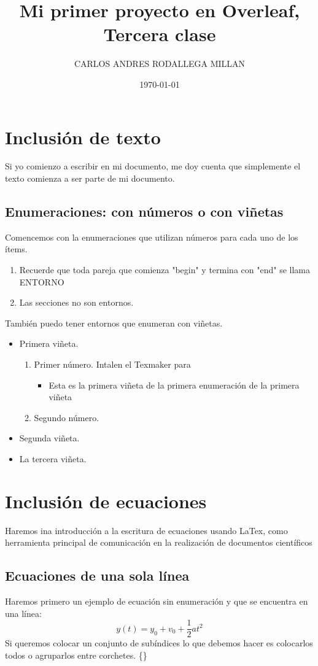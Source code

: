 \documentclass[onecolumn]{article} %
\title{Mi primer proyecto en Overleaf, Tercera clase}
\author{CARLOS ANDRES RODALLEGA MILLAN}
\date{\today}
\begin{document}
\maketitle %
\section{Inclusión de texto} %
Si yo comienzo a escribir en mi documento, me doy cuenta que simplemente el texto comienza a ser parte de mi documento.
\subsection{Enumeraciones: con números o con viñetas}
Comencemos con la enumeraciones que utilizan números para cada uno de los ítems.
\begin{enumerate}
    \item Recuerde que toda pareja que comienza "begin" y termina con "end" se llama ENTORNO
    \item Las secciones no son entornos.
\end{enumerate}
También puedo tener entornos que enumeran con viñetas.
\begin{itemize}
    \item Primera viñeta.
    \begin{enumerate}
        \item Primer número.
        Intalen el Texmaker para   
        \begin{itemize}
            \item Esta es la primera viñeta de la primera enumeración de la primera viñeta
        \end{itemize}
        \item Segundo número.
    \end{enumerate}
    \item Segunda viñeta.
    \item La tercera viñeta.
\end{itemize}
\section{Inclusión de ecuaciones} %
Haremos ina introducción a la escritura de ecuaciones usando LaTex, como herramienta principal de comunicación en la realización de documentos científicos
	\subsection{Ecuaciones de una sola línea}
	Haremos primero un ejemplo de ecuación sin enumeración y que se encuentra en una línea:
	$$y(t)=y_0+v_0+\frac{1}{2}at^2$$
	Si queremos colocar un conjunto de subíndices lo que debemos hacer es colocarlos todos o agruparlos entre 				corchetes. \{\}
\end{document}
